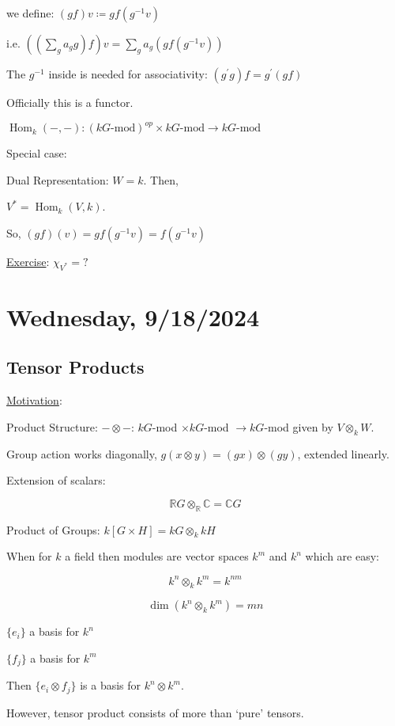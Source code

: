 \documentclass{article}
\theoremstyle{definition}
\newcommand{\Hom}{\operatorname{Hom}}
\begin{document}
we define: \((gf)v \coloneqq g f(g ^{-1} v)\) 

i.e. \(((\sum_{g} a_g g)f)v = \sum_{g} a_g (g f (g ^{-1} v))\) 

The \(g ^{-1} \) inside is needed for associativity: \((g^{\prime} g)f = g^{\prime} (gf)\) 

Officially this is a functor.

\(\Hom_k(-,-):(kG\text{-mod})^{op} \times kG\text{-mod}\to kG\text{-mod}\) 

Special case:

Dual Representation: \(W = k\). Then,

\(V^{\ast} = \Hom_k(V,k)\).

So, \((gf)(v)=gf(g ^{-1} v) = f(g ^{-1} v)\)

\underline{Exercise}: \(\chi_{V^{\ast}}=?\) 


\section*{Wednesday, 9/18/2024}

\subsection*{Tensor Products}

\underline{Motivation}:

Product Structure: \(- \otimes -\): \(kG\)-mod \(\times kG\)-mod \(\to kG\)-mod given by \(V \otimes_k W\).

Group action works diagonally, \(g(x \otimes y) = (gx) \otimes (gy)\), extended linearly.

Extension of scalars:

\[
    \mathbb{R} G \otimes _ \mathbb{R} \mathbb{C} = \mathbb{C} G
\]

Product of Groups: \(k[G \times H] = kG \otimes _k kH\) 

When for \(k\) a field then modules are vector spaces \(k^m\) and \(k^n\) which are easy:

\[
    k^n \otimes_k k^m = k^{nm}
\]

\[
    \dim(k^n \otimes_k k^m) = mn
\]

\(\{ e_i \} \) a basis for \(k^n\) 

\(\{ f_j \} \) a basis for \(k^m\) 

Then \(\{ e_i \otimes f_j \} \) is a basis for \(k^n \otimes k^m\).

However, tensor product consists of more than `pure' tensors.
\end{document}
